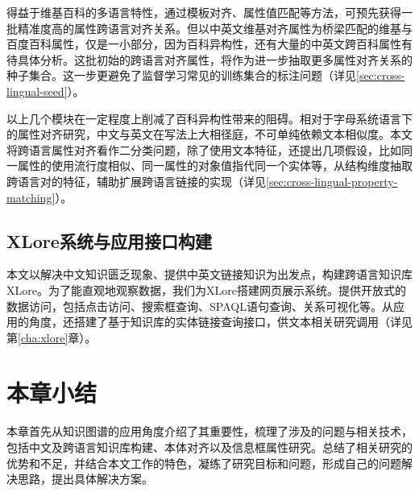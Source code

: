 得益于维基百科的多语言特性，通过模板对齐、属性值匹配等方法，可预先获得一批精准度高的属性跨语言对齐关系。但以中英文维基对齐属性为桥梁匹配的维基与百度百科属性，仅是一小部分，因为百科异构性，还有大量的中英文跨百科属性有待具体分析。这批初始的跨语言对齐属性，将作为进一步抽取更多属性对齐关系的种子集合。这一步更避免了监督学习常见的训练集合的标注问题（详见\ref{sec:cross-lingual-seed}）。

以上几个模块在一定程度上削减了百科异构性带来的阻碍。相对于字母系统语言下的属性对齐研究，中文与英文在写法上大相径庭，不可单纯依赖文本相似度。本文将跨语言属性对齐看作二分类问题，除了使用文本特征，还提出几项假设，比如同一属性的使用流行度相似、同一属性的对象值指代同一个实体等，从结构维度抽取跨语言对的特征，辅助扩展跨语言链接的实现（详见\ref{sec:cross-lingual-property-matching}）。

\subsection{XLore系统与应用接口构建}
本文以解决中文知识匮乏现象、提供中英文链接知识为出发点，构建跨语言知识库XLore。为了能直观地观察数据，我们为XLore搭建网页展示系统。提供开放式的数据访问，包括点击访问、搜索框查询、SPAQL语句查询、关系可视化等。从应用的角度，还搭建了基于知识库的实体链接查询接口，供文本相关研究调用（详见第\ref{cha:xlore}章）。

\section{本章小结}
本章首先从知识图谱的应用角度介绍了其重要性，梳理了涉及的问题与相关技术，包括中文及跨语言知识库构建、本体对齐以及信息框属性研究。总结了相关研究的优势和不足，并结合本文工作的特色，凝练了研究目标和问题，形成自己的问题解决思路，提出具体解决方案。
